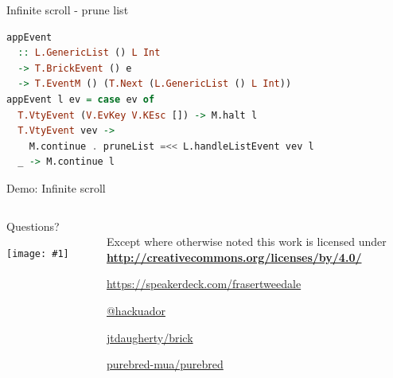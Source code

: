 \documentclass[ignorenonframetext,aspectratio=169,dvipsnames]{beamer}
\newcommand{\includegraphicsscaled}[1]{
    \texttt{[image: \#1]}
}
\begin{document}
\begin{frame}[fragile]{Infinite scroll - prune list}
\begin{lstlisting}[language=Haskell]
appEvent
  :: L.GenericList () L Int
  -> T.BrickEvent () e
  -> T.EventM () (T.Next (L.GenericList () L Int))
appEvent l ev = case ev of
  T.VtyEvent (V.EvKey V.KEsc []) -> M.halt l
  T.VtyEvent vev ->
    M.continue . pruneList =<< L.handleListEvent vev l
  _ -> M.continue l
\end{lstlisting}
\end{frame}

\begin{frame}[plain]
\huge
  Demo: Infinite scroll
\end{frame}


\begin{frame}[plain]
\begin{columns}

  \begin{column}{.4\textwidth}
    \begin{center}
    {
        \Large Questions?\\
        \medskip
        \includegraphicsscaled{brick-final-whitebg.png}
    }
    \end{center}


  \end{column}

  \begin{column}{.6\textwidth}
    \hypersetup{urlcolor=black}

    \setlength{\parskip}{.5em}

    { \centering

    
    \\
    { \scriptsize
    Except where otherwise noted this work is licensed under
    }\\
    { \footnotesize
      \textbf{\url{http://creativecommons.org/licenses/by/4.0/}}
    }

    \bigskip
    \large \tt

    \url{https://speakerdeck.com/frasertweedale}

    \href{https://twitter.com/hackuador}{@hackuador}

    \href{https://github.com/jtdaugherty/brick}{jtdaugherty/brick}

    \href{https://github.com/purebred-mua/purebred}{purebred-mua/purebred}

    }
  \end{column}

\end{columns}
\end{frame}
\end{document}
